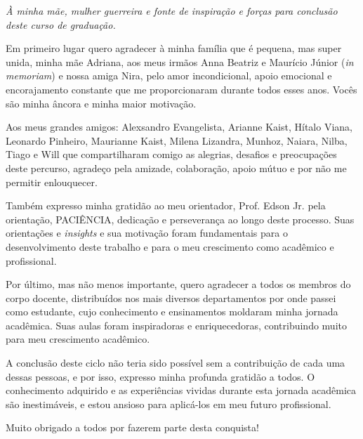 \documentclass[
	12pt,			%
	openright,		%
	oneside,	
	a4paper,		%
	english,		%
	brazil			%
]{abntex2/abntex2}  %
\begin{document}
	\begin{dedicatoria}
		
		\vspace*{\fill}
		\noindent
		\leftskip=7cm
		\textit{À minha mãe, mulher guerreira e fonte de inspiração e forças para conclusão deste curso de graduação.}
		\vspace{5cm}
	
	\end{dedicatoria}

	\begin{agradecimentos}

		Em primeiro lugar quero agradecer à minha família que é pequena, mas super unida, minha mãe Adriana, aos meus irmãos Anna Beatriz e Maurício Júnior (\textit{in memoriam}) e nossa amiga Nira, pelo amor incondicional, apoio emocional e encorajamento constante que me proporcionaram durante todos esses anos. Vocês são minha âncora e minha maior motivação.
		
		Aos meus grandes amigos: Alexsandro Evangelista, Arianne Kaist, Hítalo Viana, Leonardo Pinheiro, Maurianne Kaist, Milena Lizandra, Munhoz, Naiara, Nilba, Tiago e Will que compartilharam comigo as alegrias, desafios e preocupações deste percurso, agradeço pela amizade, colaboração, apoio mútuo e por não me permitir enlouquecer.
		
		Também expresso minha gratidão ao meu orientador, Prof. Edson Jr. pela orientação, PACIÊNCIA, dedicação e perseverança ao longo deste processo. Suas orientações e \textit{insights} e sua motivação foram fundamentais para o desenvolvimento deste trabalho e para o meu crescimento como acadêmico e profissional.
		
		Por último, mas não menos importante, quero agradecer a todos os membros do corpo docente, distribuídos nos mais diversos departamentos por onde passei como estudante, cujo conhecimento e ensinamentos moldaram minha jornada acadêmica. Suas aulas foram inspiradoras e enriquecedoras, contribuindo muito para meu crescimento acadêmico.
		
		A conclusão deste ciclo não teria sido possível sem a contribuição de cada uma dessas pessoas, e por isso, expresso minha profunda gratidão a todos. O conhecimento adquirido e as experiências vividas durante esta jornada acadêmica são inestimáveis, e estou ansioso para aplicá-los em meu futuro profissional.
		
		Muito obrigado a todos por fazerem parte desta conquista!

	\end{agradecimentos}
\end{document}
